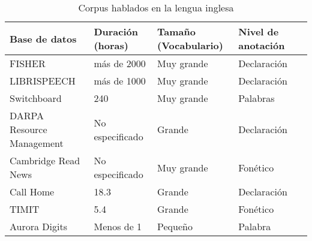 \begin{table}[H]
\centering
\caption{Corpus hablados en la lengua inglesa}
\label{tab:english_corpora}
\begin{tabular}{|m{35mm}|l|l|l|l|}
\toprule
\textbf{Base de datos} & \textbf{Duración (horas)} & \textbf{Tamaño (Vocabulario)} & \textbf{Nivel de anotación}\\
\hline
FISHER\cite{CieriTheSpeech-to-Text}  & más de 2000 & Muy grande &  Declaración\\
\hline
LIBRISPEECH\cite{PanayotovLIBRISPEECH:BOOKS}  & más de 1000 & Muy grande &  Declaración\\
\hline

Switchboard \cite{Godfrey1992SWITCHBOARD:Development}  & 240 & Muy grande & Palabras\\
\hline
DARPA Resource Management \cite{Lucke1992ExpandingCorpus} & No especificado  & Grande & Declaración \\
\hline
Cambridge Read News \cite{RobinsonWSJCAM0:RECOGNITION}  & No especificado & Muy grande & Fonético\\
\hline
Call Home  \cite{Fu-HuaLiuSpeechCorpus} & 18.3 & Grande & Declaración\\
\hline
TIMIT \cite{PriceTheRecognition} & 5.4 & Grande & Fonético \\
\hline
Aurora Digits \cite{EvansEfficientCorpus}  & Menos de 1 & Pequeño & Palabra\\
\hline



\end{tabular}
\end{table}